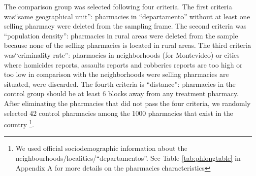 \documentclass[11pt]{article}
\begin{document}
The comparison group was selected following four criteria. The first criteria was``same  geographical unit'':  pharmacies in ``departamento'' without at least one selling pharmacy were deleted from the sampling frame. The second criteria was ``population density'':  pharmacies in rural areas were deleted from the sample because none of the selling pharmacies is located in rural areas. The third criteria was``criminality rate'': pharmacies in neighborhoods (for Montevideo) or cities where homicides reports, assaults reports and robberies reports are too high or too low  in comparison with the neighborhoods were selling pharmacies are situated, were discarded. The fourth criteria is ``distance'': pharmacies in the control group should be at least 6 blocks away from any treatment pharmacy. After eliminating the pharmacies that did not pass the four criteria, we randomly selected 42 control pharmacies among the 1000 pharmacies that exist in the country \footnote{We used official sociodemographic information about the neighbourhoods/localities/``departamentos''. See Table \ref{tab:phlongtable} in Appendix A for more details on the pharmacies characteristics}.
\end{document}

